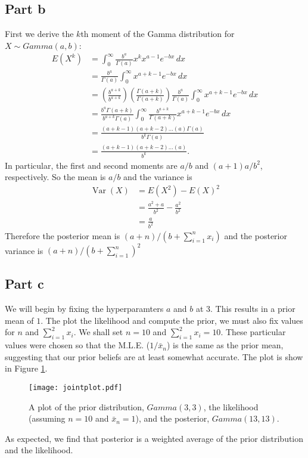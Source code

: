 \documentclass[a4paper,10pt]{article}
\DeclareMathOperator{\Var}{Var}
\begin{document}
\subsection{Part b}
First we derive the $k$th moment of the Gamma distribution for $X \sim Gamma(a,b)$:
\begin{align*}
 E(X^k) &= \int_0^\infty {\frac{b^a}{\Gamma(a)}x^kx^{a-1} e^{-bx} \, dx} \\
 &= \frac{b^a}{\Gamma(a)} \int_0^\infty x^{a+k-1} e^{-bx} \, dx \\
 &= \left(\frac{b^{a+k}}{b^{a+k}}\right)\left(\frac{\Gamma(a+k)}{\Gamma(a+k)}\right)\frac{b^a}{\Gamma(a)} \int_0^\infty x^{a+k-1} e^{-bx} \, dx \\
 &= \frac{b^a\Gamma(a+k)}{b^{a+k}\Gamma(a)} \int_0^\infty \frac{b^{a+k}}{\Gamma(a+k)}x^{a+k-1} e^{-bx} \, dx \\
 &= \frac{(a+k-1)(a+k-2)\hdots(a)\Gamma(a)}{b^k\Gamma(a)} \\
 &= \frac{(a+k-1)(a+k-2)\hdots(a)}{b^k}.
\end{align*}
In particular, the first and second moments are $a/b$ and $(a+1)a/b^2$, respectively.  So the mean is $a/b$ and the variance is
\begin{align*}
  \Var(X) &= E(X^2) - E(X)^2 \\
  &= \frac{a^2 + a}{b^2} - \frac{a^2}{b^2} \\
  &= \frac{a}{b^2}
\end{align*}
Therefore the posterior mean is $(a+n)/(b+\sum_{i=1}^{n}{x_{i}})$ and the posterior variance is $(a+n)/(b+\sum_{i=1}^{n})^{2}$
\subsection{Part c}
We will begin by fixing the hyperparamters $a$ and $b$ at 3.  This results in a prior mean of $1$.  The plot the likelihood and compute the prior, we must also fix values for $n$ and $\sum_{i=1}^{2}x_{i}$.  We shall set $n=10$ and $\sum_{i=1}^{2}x_{i} = 10$.  These particular values were chosen so that the M.L.E. ($1/\bar{x}_{n}$) is the same as the prior mean, suggesting that our prior beliefs are at least somewhat accurate.  The plot is show in Figure \ref{jointplot}.
\begin{figure}
\centering
\texttt{[image: jointplot.pdf]}
\caption{\label{jointplot} A plot of the prior distribution, $Gamma(3,3)$, the likelihood (assuming $n=10$ and $\bar{x}_{n}=1$), and the posterior, $Gamma(13, 13)$.}
\end{figure}
As expected, we find that posterior is a weighted average of the prior distribution and the likelihood.
\end{document}
